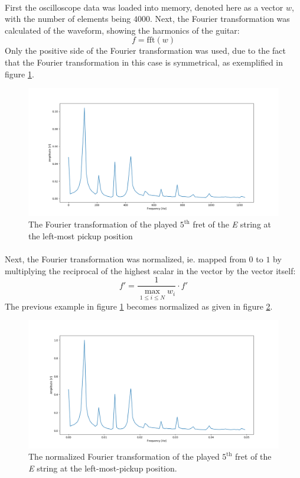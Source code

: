 \documentclass{article}
\begin{document}
\paragraph*{}
First the oscilloscope data was loaded into memory, denoted here as a vector 
$w$, with the number of elements being $4000$. Next, the Fourier 
transformation was calculated of the waveform, showing the harmonics of the 
guitar:
$$f = \text{fft}(w)$$
Only the positive side of the Fourier transformation was used, due to 
the fact that the Fourier transformation in this case is symmetrical, as 
exemplified in figure \ref{fig:fou-0-5-e}.
\begin{figure}[ht]
	\centering
	\includegraphics[width=\textwidth]{img/fou-0-5-e}
	\caption{The Fourier transformation of the played $5^{\text{th}}$ fret of 
	the \textit{E} string at the left-most pickup position}
	\label{fig:fou-0-5-e}
\end{figure}

\paragraph*{}
Next, the Fourier transformation was normalized, ie. mapped from $0$ to $1$ by 
multiplying the reciprocal of the highest scalar in the vector by the vector 
itself:
$$f' = \frac{1}{\max_{1 \leq i \leq N} w_i} \cdot f'$$
The previous example in figure \ref{fig:fou-0-5-e} becomes normalized as given 
in figure \ref{fig:fou-n-0-5-e}.
\begin{figure}[ht]
	\centering
	\includegraphics[width=\textwidth]{img/fou-n-0-5-e}
	\caption{The normalized Fourier transformation of the played 
		$5^{\text{th}}$ fret of the \textit{E} string at the left-most-pickup 
	position.}
	\label{fig:fou-n-0-5-e}
\end{figure}
\end{document}
